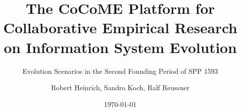 \documentclass[12pt,headsepline,twoside,final]{scrreprt}
\begin{document}
	\setpdf
	
	\setcounter{secnumdepth}{3}
	
	\title{The CoCoME Platform for \linebreak Collaborative Empirical Research on Information System Evolution} 
	\subtitle{Evolution Scenarios in the Second Founding Period of SPP 1593}
	
	\author{Robert Heinrich, Sandro Koch, Ralf Reussner}
	
	\date{\today}
	
	
	
	\maketitle
	\clearpage
	
	\tableofcontents
	\clearpage
	
	\listoffigures
	\clearpage
	
	
	
	
	
	
	
	
	
	
	
	
	
	
	
	
	\nocite{*}
	
	
	
	\sloppy
\end{document}
